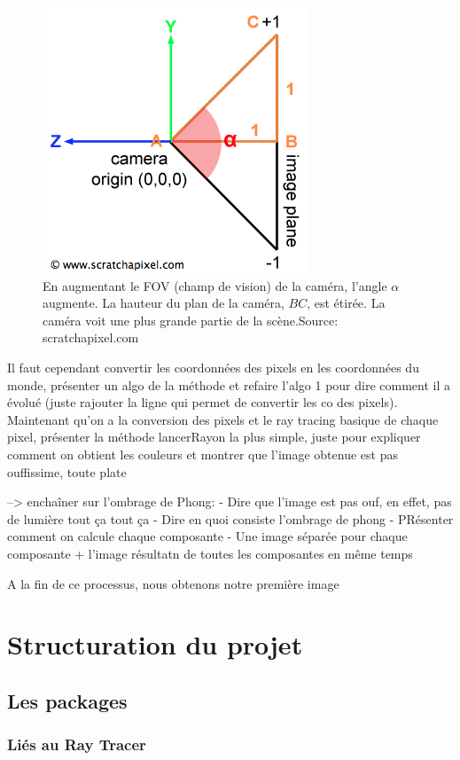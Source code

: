 \documentclass[11pt]{article}
\begin{document}
\begin{figure}[h!]
	\includegraphics{img/rt/final/fovCamera.png}

	\label{fovCam}
	\caption{En augmentant le FOV (champ de vision) de la caméra, l'angle $\alpha$ augmente. La hauteur du plan de la caméra, $BC$, est étirée. La caméra voit une plus grande partie de la scène.\break Source: scratchapixel.com}
\end{figure}
\FloatBarrier

Il faut cependant convertir les coordonnées des pixels en les coordonnées du monde, présenter un algo de la méthode et refaire l'algo 1 pour dire comment il a évolué (juste rajouter la ligne qui permet de convertir les co des pixels). 
Maintenant qu'on a la conversion des pixels et le ray tracing basique de chaque pixel, présenter la méthode lancerRayon la plus simple, juste pour expliquer comment on obtient les couleurs et montrer que l'image obtenue est pas ouffissime, toute plate

--> enchaîner sur l'ombrage de Phong:
	- Dire que l'image est pas ouf, en effet, pas de lumière tout ça tout ça
	- Dire en quoi consiste l'ombrage de phong
	- PRésenter comment on calcule chaque composante
	- Une image séparée pour chaque composante + l'image résultatn de toutes les composantes en même temps

A la fin de ce processus, nous obtenons notre première image 

\section{Structuration du projet}
\subsection{Les packages}
\subsubsection{Liés au Ray Tracer}
\end{document}
